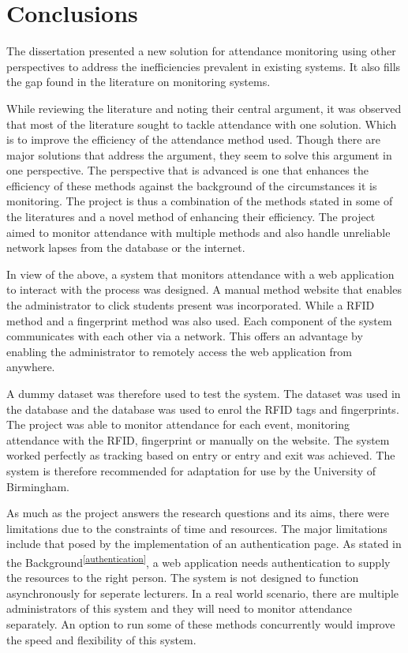\chapter{Conclusions}
The dissertation presented a new solution for attendance monitoring using other perspectives to address the inefficiencies prevalent in existing systems. It also fills the gap found in the literature on monitoring systems. 

While reviewing the literature and noting their central argument, it was observed that most of the literature sought to tackle attendance with one solution. Which is to improve the efficiency of the attendance method used. Though there are major solutions that address the argument, they seem to solve this argument in one perspective. The perspective that is advanced is one that enhances the efficiency of these methods against the background of the circumstances it is monitoring. The project is thus a combination of the methods stated in some of the literatures and a novel method of enhancing their efficiency. The project aimed to monitor attendance with multiple methods and also handle unreliable network lapses from the database or the internet. 

In view of the above, a system that monitors attendance with a web application to interact with the process was designed. A manual method website that enables the administrator to click students present was incorporated. While a \gls{RFID} method and a fingerprint method was also used. Each component of the system communicates with each other via a network. This offers an advantage by enabling the administrator to remotely access the web application from anywhere.

A dummy dataset was therefore used to test the system. The dataset was used in the database and the database was used to enrol the \gls{RFID} tags and fingerprints. The project was able to monitor attendance for each event, monitoring attendance with the \gls{RFID}, fingerprint or manually on the website. The system worked perfectly as tracking based on entry or entry and exit was achieved. The system is therefore recommended for adaptation for use by the University of Birmingham.

As much as the project answers the research questions and its aims, there were limitations due to the constraints of time and resources. The major limitations include that posed by the implementation of an authentication page. As stated in the Background\textsuperscript{\ref{authentication}}, a web application needs authentication to supply the resources to the right person. The system is not designed to function asynchronously for seperate lecturers. In a real world scenario, there are multiple administrators of this system and they will need to monitor attendance separately. An option to run some of these methods concurrently would improve the speed and flexibility of this system.


